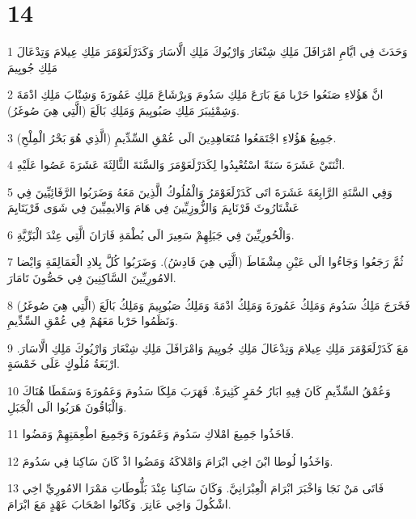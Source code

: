\chapter{14}

\par 1 وَحَدَثَ فِي ايَّامِ امْرَافَلَ مَلِكِ شِنْعَارَ وَارْيُوكَ مَلِكِ الَّاسَارَ وَكَدَرْلَعَوْمَرَ مَلِكِ عِيلامَ وَتِدْعَالَ مَلِكِ جُويِيمَ
\par 2 انَّ هَؤُلاءِ صَنَعُوا حَرْبا مَعَ بَارَعَ مَلِكِ سَدُومَ وَبِرْشَاعَ مَلِكِ عَمُورَةَ وَشِنْابَ مَلِكِ ادْمَةَ وَشِمْئِيبَرَ مَلِكِ صَبُويِيمَ وَمَلِكِ بَالَعَ (الَّتِي هِيَ صُوغَرُ).
\par 3 جَمِيعُ هَؤُلاءِ اجْتَمَعُوا مُتَعَاهِدِينَ الَى عُمْقِ السِّدِّيمِ (الَّذِي هُوَ بَحْرُ الْمِلْحِ).
\par 4 اثْنَتَيْ عَشَرَةَ سَنَةً اسْتُعْبِدُوا لِكَدَرْلَعَوْمَرَ وَالسَّنَةَ الثَّالِثَةَ عَشَرَةَ عَصُوا عَلَيْهِ.
\par 5 وَفِي السَّنَةِ الرَّابِعَةَ عَشَرَةَ اتَى كَدَرْلَعَوْمَرُ وَالْمُلُوكُ الَّذِينَ مَعَهُ وَضَرَبُوا الرَّفَائِيِّينَ فِي عَشْتَارُوثَ قَرْنَايِمَ وَالزُّوزِيِّينَ فِي هَامَ وَالايمِيِّينَ فِي شَوَى قَرْيَتَايِمَ
\par 6 وَالْحُورِيِّينَ فِي جَبَلِهِمْ سَعِيرَ الَى بُطْمَةِ فَارَانَ الَّتِي عِنْدَ الْبَرِّيَّةِ.
\par 7 ثُمَّ رَجَعُوا وَجَاءُوا الَى عَيْنِ مِشْفَاطَ (الَّتِي هِيَ قَادِشُ). وَضَرَبُوا كُلَّ بِلادِ الْعَمَالِقَةِ وَايْضا الامُورِيِّينَ السَّاكِنِينَ فِي حَصُّونَ تَامَارَ.
\par 8 فَخَرَجَ مَلِكُ سَدُومَ وَمَلِكُ عَمُورَةَ وَمَلِكُ ادْمَةَ وَمَلِكُ صَبُويِيمَ وَمَلِكُ بَالَعَ (الَّتِي هِيَ صُوغَرُ) وَنَظَمُوا حَرْبا مَعَهُمْ فِي عُمْقِ السِّدِّيمِ.
\par 9 مَعَ كَدَرْلَعَوْمَرَ مَلِكِ عِيلامَ وَتِدْعَالَ مَلِكِ جُويِيمَ وَامْرَافَلَ مَلِكِ شِنْعَارَ وَارْيُوكَ مَلِكِ الَّاسَارَ. ارْبَعَةُ مُلُوكٍ عَلَى خَمْسَةٍ.
\par 10 وَعُمْقُ السِّدِّيمِ كَانَ فِيهِ ابَارُ حُمَرٍ كَثِيرَةٌ. فَهَرَبَ مَلِكَا سَدُومَ وَعَمُورَةَ وَسَقَطَا هُنَاكَ وَالْبَاقُونَ هَرَبُوا الَى الْجَبَلِ.
\par 11 فَاخَذُوا جَمِيعَ امْلاكِ سَدُومَ وَعَمُورَةَ وَجَمِيعَ اطْعِمَتِهِمْ وَمَضُوا.
\par 12 وَاخَذُوا لُوطا ابْنَ اخِي ابْرَامَ وَامْلاكَهُ وَمَضُوا اذْ كَانَ سَاكِنا فِي سَدُومَ.
\par 13 فَاتَى مَنْ نَجَا وَاخْبَرَ ابْرَامَ الْعِبْرَانِيَّ. وَكَانَ سَاكِنا عِنْدَ بَلُّوطَاتِ مَمْرَا الامُورِيِّ اخِي اشْكُولَ وَاخِي عَانِرَ. وَكَانُوا اصْحَابَ عَهْدٍ مَعَ ابْرَامَ.
